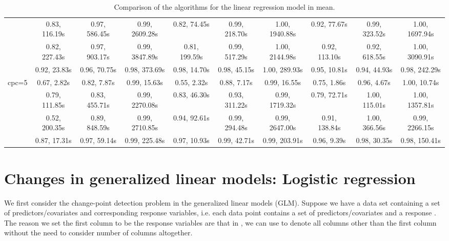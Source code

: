 \documentclass[article]{jss}\usepackage[]{graphicx}\usepackage[]{xcolor}
\begin{document}
\begin{landscape}
\begin{table}[t!]
\begin{tabular}{@{}cccccccccc@{}}
                          & 0.83, 116.19s & 0.97, 586.45s & 0.99, 2609.28s & 0.82, 74.45s & 0.99, 218.70s & 1.00, 1940.88s & 0.92, 77.67s & 0.99, 323.52s & 1.00, 1697.94s \\
                          & 0.82, 227.43s & 0.97, 903.17s & 0.99, 3847.89s & 0.81, 199.59s & 0.99, 517.29s & 1.00, 2144.98s & 0.92, 113.10s & 0.92, 618.55s & 1.00, 3090.91s \\
                          & 0.92, 23.83s & 0.96, 70.75s & 0.98, 373.69s & 0.98, 14.70s & 0.98, 45.15s & 1.00, 289.93s & 0.95, 10.81s & 0.94, 44.93s & 0.98, 242.29s \\ \midrule
  \multirow{4}{*}{cpc=5} & 0.67, 2.82s & 0.82, 7.87s & 0.99, 15.63s & 0.55, 2.32s & 0.88, 7.17s & 0.99, 16.55s & 0.75, 1.86s & 0.96, 4.67s & 1.00, 10.74s \\
                          & 0.79, 111.85s & 0.83, 455.71s & 0.99, 2270.08s & 0.83, 46.30s & 0.93, 311.22s & 0.99, 1719.32s & 0.79, 72.71s & 1.00, 115.01s & 1.00, 1357.81s \\
                          & 0.52, 200.35s & 0.89, 848.59s & 0.99, 2710.85s & 0.94, 92.61s & 0.99, 294.48s & 0.99, 2647.00s & 0.91, 138.84s & 1.00, 366.56s & 0.99, 2266.15s \\
                          & 0.87, 17.31s & 0.97, 59.14s & 0.99, 225.48s & 0.97, 10.93s & 0.99, 42.71s & 0.99, 203.91s & 0.96, 9.39s & 0.98, 30.35s & 0.98, 150.41s \\ \bottomrule
  \end{tabular}
  \caption{\label{tab:linear regression comparison} Comparison of the algorithms for the linear regression model in mean.}
\end{table}

\end{landscape}
\restoregeometry

\section{Changes in generalized linear models: Logistic regression} \label{sec:logistic_regression}

We first consider the change-point detection problem in the generalized linear
models (GLM). Suppose we have a data set containing a set of
predictors/covariates and corresponding response variables, i.e. each data point
 contains a set of predictors/covariates  and
a response . The reason we set the first column to be the
response variables are that in , we can use  to denote all
columns other than the first column without the need to consider number of
columns altogether.
\end{document}

